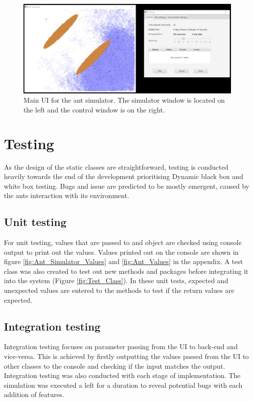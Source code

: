 \documentclass[a4paper, oneside, 11pt]{report}
\begin{document}
\begin{figure}[htb]
	\begin{center}
		\includegraphics[width=1.0 \columnwidth]{Main_Simulator.jpg}
		\caption{Main UI for the ant simulator. The simulator window is located on the left and the control window is on the right.}
		\label{fig:Main_Simulator}
	\end{center}
\end{figure}


\chapter{Testing}
\label{chap:Testing}
As the design of the static classes are straightforward, testing is conducted heavily towards the end of the development prioritising Dynamic black box and white box testing. Bugs and issue are predicted to be mostly emergent, caused by the ants interaction with its environment.

\section{Unit testing}
For unit testing, values that are passed to and object are checked using console output to print out the values. Values printed out on the console are shown in figure \ref{fig:Ant_Simulator_Values} and \ref{fig:Ant_Values} in the appendix. A test class was also created to test out  new methods and packages before integrating it into the system (Figure \ref{fig:Test_Class}). In these unit tests, expected and unexpected values are entered to the methods to test if the return values are expected.

\section{Integration testing}
Integration testing focuses on parameter passing from the UI to back-end and vice-versa. This is achieved by firstly outputting the values passed from the UI to other classes to the console and checking if the input matches the output. Integration testing was also conducted with each stage of implementation. The simulation was executed a left for a duration to reveal potential bugs with each addition of features. 
\end{document}
